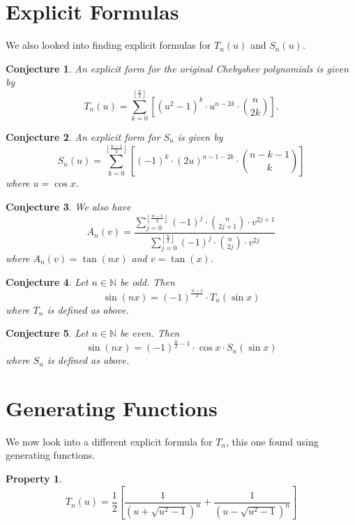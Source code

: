 \documentclass[12pt, letterpaper]{article} %
\newtheorem{theorem}{Property}
\newtheorem{conjecture}{Conjecture}
\begin{document}
\section{Explicit Formulas}
We also looked into finding explicit formulas for $T_n(u)$ and $S_n(u)$. \\

\begin{conjecture}An explicit form for the original Chebyshev polynomials is given by $$T_n(u) = \displaystyle\sum_{k=0}^{\left\lfloor \tfrac{n}{2} \right\rfloor} \left[(u^2-1)^k \cdot u^{n-2k} \cdot \binom{n}{2k}\right].$$\end{conjecture}

\begin{conjecture}
An explicit form for $S_{n}$ is given by
$$ S_{n}(u) = \displaystyle\sum_{k=0}^{\left\lfloor \tfrac{n-1}{2} \right\rfloor} \left[(-1)^k \cdot (2u)^{n-1-2k} \cdot \binom{n-k-1}{k}\right]$$
where $u = \cos{x}$.
\end{conjecture}

\begin{conjecture}
We also have
$$A_n(v) = \dfrac{\displaystyle\sum_{j=0}^{\left\lfloor \frac{n-1}{2} \right\rfloor} (-1)^j \cdot \binom{n}{2j + 1}\cdot v^{2j + 1}}{\displaystyle\sum_{j=0}^{\left\lfloor \frac{n}{2} \right\rfloor} (-1)^j \cdot \binom{n}{2j}\cdot v^{2j}}$$
where $A_n(v) =  \tan(nx)$ and $v=\tan(x)$.
\end{conjecture}

\begin{conjecture} Let $n \in \mathbb{N}$ be odd. Then
$$ \sin(nx) = (-1)^{\frac{n-1}{2}}\cdot  T_{n}(\sin x)$$
where $T_{n}$ is defined as above. \end{conjecture}

\begin{conjecture}
Let $n \in \mathbb{N}$ be even. Then
$$ \sin(nx) = (-1)^{\frac{n}{2}-1} \cdot \cos x \cdot S_{n}(\sin x)$$
where $S_{n}$ is defined as above.
\end{conjecture}
\newpage
\section{Generating Functions}
We now look into a different explicit formula for $T_n$, this one found using generating functions.\\

\begin{theorem}
$$ T_{n}(u) = \frac{1}{2} \left[ \frac{1}{(u+\sqrt{u^{2}-1})^{n}} + \frac{1}{(u-\sqrt{u^{2}-1})^{n}} \right]$$
\end{theorem}
\end{document}

